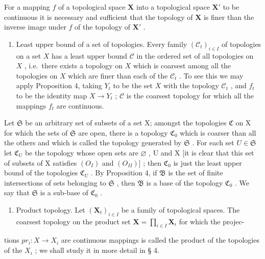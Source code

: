 For a mapping \(f\) of a topological space \(\mathbf{X}\) into a topological space \(\mathbf{X}'\) to be continuous it is necessary and sufficient that the topology of \(\mathbf{X}\) is finer than the inverse image under \(f\) of the topology of \(\mathbf{X}'\) .

\begin{enumerate}
\def\labelenumi{\arabic{enumi})}
\setcounter{enumi}{1}
\tightlist
\item
  Least upper bound of a set of topologies. Every family \((\mathcal{C}_t)_{i\in I}\) of topologies on a set \(X\) has a least upper bound \(\mathcal{C}\) in the ordered set of all topologies on \(X\) , i.e.~there exists a topology on \(X\) which is coarsest among all the topologies on \(X\) which are finer than each of the \(\mathcal{C}_t\) . To see this we may apply Proposition 4, taking \(Y_t\) to be the set \(X\) with the topology \(\mathcal{C}_t\) , and \(f_t\) to be the identity map \(X\to Y_t\) ; \(\mathcal{C}\) is the coarsest topology for which all the mappings \(f_t\) are continuous.
\end{enumerate}

Let \(\mathfrak{S}\) be an arbitrary set of subsets of a set X; amongst the topologies \(\mathfrak{C}\) on X for which the sets of \(\mathfrak{S}\) are open, there is a topology \(\mathfrak{C}_0\) which is coarser than all the others and which is called the topology generated by \(\mathfrak{S}\) . For each set \(U \in \mathfrak{S}\) let \(\mathfrak{C}_U\) be the topology whose open sets are \(\varnothing\) , U and X {[}it is clear that this set of subsets of X satisfies \((O_I)\) and \((O_{II})]\) ; then \(\mathfrak{C}_0\) is just the least upper bound of the topologies \(\mathfrak{C}_U\) . By Proposition 4, if \(\mathfrak{B}\) is the set of finite intersections of sets belonging to \(\mathfrak{S}\) , then \(\mathfrak{B}\) is a base of the topology \(\mathfrak{C}_0\) . We say that \(\mathfrak{S}\) is a sub-base of \(\mathfrak{C}_0\) .

\begin{enumerate}
\def\labelenumi{\arabic{enumi})}
\setcounter{enumi}{2}
\tightlist
\item
  Product topology. Let \((\mathbf{X}_t)_{i \in I}\) be a family of topological spaces. The coarsest topology on the product set \(\mathbf{X} = \prod_{i \in I} \mathbf{X}_i\) for which the projec-
\end{enumerate}

tions \(pr_{i}: X \rightarrow X_{i}\) are continuous mappings is called the product of the topologies of the \(X_{i}\) ; we shall study it in more detail in § 4.

